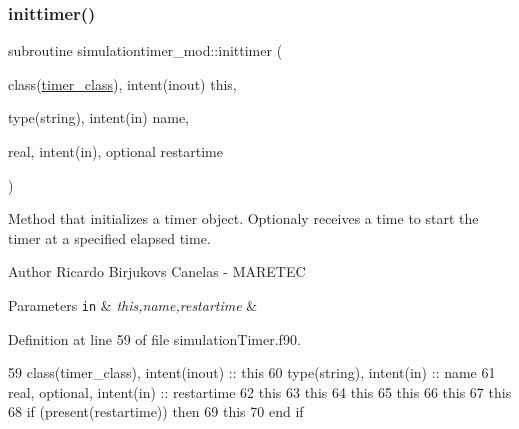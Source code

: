\subsubsection{\texorpdfstring{inittimer()}{inittimer()}}
{\footnotesize\ttfamily subroutine simulationtimer\+\_\+mod\+::inittimer (\begin{DoxyParamCaption}\item[{class(\mbox{\hyperlink{structsimulationtimer__mod_1_1timer__class}{timer\+\_\+class}}), intent(inout)}]{this,  }\item[{type(string), intent(in)}]{name,  }\item[{real, intent(in), optional}]{restartime }\end{DoxyParamCaption})\hspace{0.3cm}{\ttfamily [private]}}



Method that initializes a timer object. Optionaly receives a time to start the timer at a specified elapsed time. 

\begin{DoxyAuthor}{Author}
Ricardo Birjukovs Canelas -\/ M\+A\+R\+E\+T\+EC 
\end{DoxyAuthor}

\begin{DoxyParams}[1]{Parameters}
\mbox{\tt in}  & {\em this,name,restartime} & \\
\hline
\end{DoxyParams}


Definition at line 59 of file simulation\+Timer.\+f90.


\begin{DoxyCode}
59     \textcolor{keywordtype}{class}(timer\_class), \textcolor{keywordtype}{intent(inout)} :: this
60     \textcolor{keywordtype}{type}(string), \textcolor{keywordtype}{intent(in)} :: name
61     \textcolor{keywordtype}{real}, \textcolor{keywordtype}{optional}, \textcolor{keywordtype}{intent(in)} :: restartime
62     this%
63     this%
64     this%
65     this%
66     this%
67     this%
68     \textcolor{keywordflow}{if} (\textcolor{keyword}{present}(restartime)) \textcolor{keywordflow}{then}
69         this%
70 \textcolor{keywordflow}{    end if}
\end{DoxyCode}
\mbox{\label{namespacesimulationtimer__mod_abf4d4c3f383597e975e7c9d12dab6f13}} 
